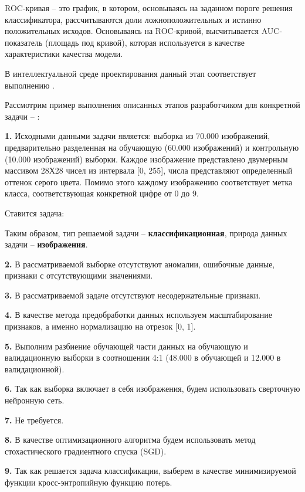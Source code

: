 ROC-кривая -- это график, в котором, основываясь на заданном пороге решения классификатора, рассчитываются доли ложноположительных и истинно положительных исходов. Основываясь на ROC-кривой, высчитывается AUC-показатель (площадь под кривой), которая используется в качестве характеристики качества модели.

В интеллектуальной среде проектирования данный этап соответствует выполнению .

Рассмотрим пример выполнения описанных этапов разработчиком для конкретной задачи -- :


\textbf{1.} Исходными данными задачи является: выборка из 70.000 изображений, предварительно разделенная на обучающую (60.000 изображений) и контрольную (10.000 изображений) выборки. Каждое изображение представлено двумерным массивом 28Х28 чисел из интервала [0, 255], числа представляют определенный оттенок серого цвета. Помимо этого каждому изображению соответствует метка класса, соответствующая конкретной цифре от 0 до 9.

Ставится задача: 

Таким образом, тип решаемой задачи -- \textbf{классификационная}, природа данных задачи -- \textbf{изображения}.


\textbf{2.} В рассматриваемой выборке отсутствуют аномалии, ошибочные данные, признаки с отсутствующими значениями.


\textbf{3.} В рассматриваемой задаче отсутствуют несодержательные признаки.


\textbf{4.} В качестве метода предобработки данных используем масштабирование признаков, а именно нормализацию на отрезок [0, 1].


\textbf{5.} Выполним разбиение обучающей части данных на обучающую и валидационную выборки в соотношении 4:1 (48.000 в обучающей и 12.000 в валидационной).


\textbf{6.} Так как выборка включает в себя изображения, будем использовать сверточную нейронную сеть.


\textbf{7.} Не требуется.


\textbf{8.} В качестве оптимизационного алгоритма будем использовать метод стохастического градиентного спуска (SGD).


\textbf{9.} Так как решается задача классификации, выберем в качестве минимизируемой функции кросс-энтропийную функцию потерь.


